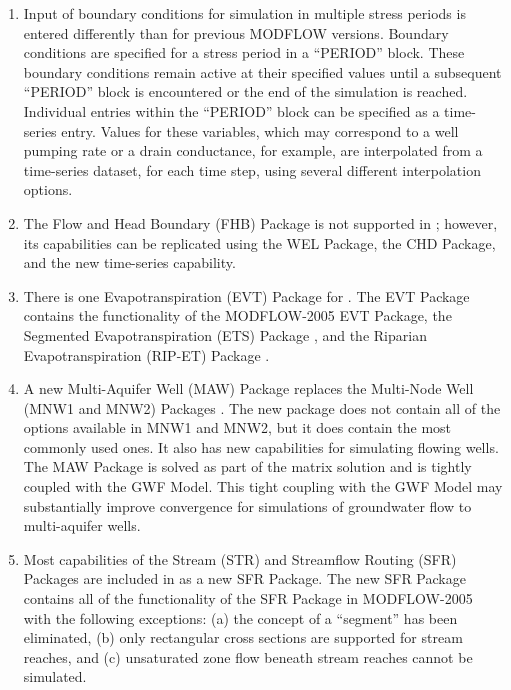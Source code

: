 \begin{enumerate}
\item Input of boundary conditions for simulation in multiple stress periods is entered differently than for previous MODFLOW versions. Boundary conditions are specified for a stress period in a ``PERIOD'' block. These boundary conditions remain active at their specified values until a subsequent ``PERIOD'' block is encountered or the end of the simulation is reached.  Individual entries within the ``PERIOD'' block can be specified as a time-series entry.  Values for these variables, which may correspond to a well pumping rate or a drain conductance, for example, are interpolated from a time-series dataset, for each time step, using several different interpolation options.

\item The Flow and Head Boundary (FHB) Package \citep{leake1997documentation, modflow2005} is not supported in \mf; however, its capabilities can be replicated using the WEL Package, the CHD Package, and the new time-series capability.

\item There is one Evapotranspiration (EVT) Package for \mf. The \mf EVT Package contains the functionality of the MODFLOW-2005 EVT Package, the Segmented Evapotranspiration (ETS) Package \citep{modflowdrtpack}, and the Riparian Evapotranspiration (RIP-ET) Package \citep{modflowripetpack}.

\item A new Multi-Aquifer Well (MAW) Package replaces the Multi-Node Well (MNW1 and MNW2) Packages \citep{halford2002, konikow2009}. The new package does not contain all of the options available in MNW1 and MNW2, but it does contain the most commonly used ones.  It also has new capabilities for simulating flowing wells. The MAW Package is solved as part of the matrix solution and is tightly coupled with the GWF Model. This tight coupling with the GWF Model may substantially improve convergence for simulations of groundwater flow to multi-aquifer wells.

\item Most capabilities of the Stream (STR) and Streamflow Routing (SFR) Packages \citep{prudic1989str, modflowsfr1pack, modflowsfr2pack} are included in \mf as a new SFR Package.  The new SFR Package contains all of the functionality of the SFR Package in MODFLOW-2005 with the following exceptions: (a) the concept of a ``segment'' has been eliminated, (b) only rectangular cross sections are supported for stream reaches, and (c) unsaturated zone flow beneath stream reaches cannot be simulated.


\end{enumerate}
